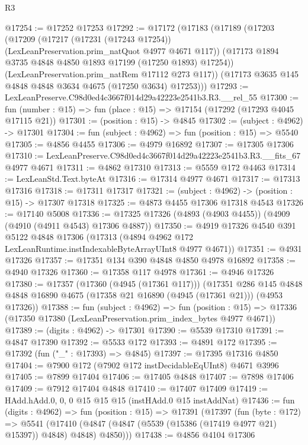 \begin{lexlean}{R3}
\begin{coremodule}
@17254 := @17252 @17253
@17292 := @17172
    (@17183
      (@17189
        (@17203
          (@17209
            (@17217 (@17231 (@17243 @17254)) (LexLeanPreservation.prim_natQuot @4977 @4671 @117))
            (@17173 @1894 @3735 @4848 @4850 @1893 @17199 (@17250 @1893) @17254))
          (LexLeanPreservation.prim_natRem @17112 @273 @117))
        (@17173 @3635 @145 @4848 @4848 @3634 @4675 (@17250 @3634) @17253)))
@17293 := LexLeanPreserve.C98d0ed4c3667f014d29a42223e2541b3.R3.__rel_55
@17300 := fun (number : @15) => fun (place : @15) => @17154 (@17292 (@17293 @4045 @17115 @21))
@17301 := (position : @15) -> @4845
@17302 := (subject : @4962) -> @17301
@17304 := fun (subject : @4962) => fun (position : @15) => @5540
@17305 := @4856 @4455
@17306 := @4979 @16892
@17307 := @17305 @17306
@17310 := LexLeanPreserve.C98d0ed4c3667f014d29a42223e2541b3.R3.__fits_67 @4977 @4671
@17311 := @4862 @17310
@17313 := @5559 @172 @4463
@17314 := LexLeanStd.Text.byteAt
@17316 := @17314 @4977 @4671
@17317 := @17313 @17316
@17318 := @17311 @17317
@17321 := (subject : @4962) -> (position : @15) -> @17307 @17318
@17325 := @4873 @4455 @17306 @17318 @4543
@17326 := @17140 @5008
@17336 := @17325 @17326 (@4893 (@4903 @4455)) (@4909 (@4910 (@4911 @4543) @17306 @4887))
@17350 := @4919
    @17326
    @4540
    @391
    @5122
    @4848
    @17306
    (@17313 (@4894 @4962 @172 LexLeanRuntime.instIndexableByteArrayUInt8 @4977 @4671))
@17351 := @4931 @17326
@17357 := @17351 @134 @390 @4848 @4850 @4978 @16892
@17358 := @4940 @17326
@17360 := @17358 @117 @4978
@17361 := @4946 @17326
@17380 := @17357
    (@17360 (@4945 (@17361 @117)))
    (@17351
      @286
      @145
      @4848
      @4848
      @16890
      @4675
      (@17358 @21 @16890 (@4945 (@17361 @21)))
      (@4953 @17326))
@17388 := fun (subject : @4962) =>
  fun (position : @15) => @17336 (@17350 @17380 (LexLeanPreservation.prim_index_bytes @4977 @4671))
@17389 := (digits : @4962) -> @17301
@17390 := @5539 @17310
@17391 := @4847 @17390
@17392 := @5533 @172
@17393 := @4891 @172
@17395 := @17392 (fun ("_" : @17393) => @4845)
@17397 := @17395 @17316 @4850
@17404 := @7900 @172 (@7902 @172 instDecidableEqUInt8) @4671 @3996
@17405 := @7899 @17404
@17406 := @17405 @4848
@17407 := @7898 @17406
@17409 := @7912 @17404 @4848
@17410 := @17407 @17409
@17419 := HAdd.hAdd.{0, 0, 0} @15 @15 @15 (instHAdd.{0} @15 instAddNat)
@17436 := fun (digits : @4962) =>
  fun (position : @15) =>
  @17391
    (@17397
      (fun (byte : @172) =>
      @5541 (@17410 (@4847 (@4847 (@5539 (@15386 (@17419 @4977 @21) @15397)) @4848) @4848) @4850)))
@17438 := @4856 @4104 @17306

\end{coremodule}
\end{lexlean}
